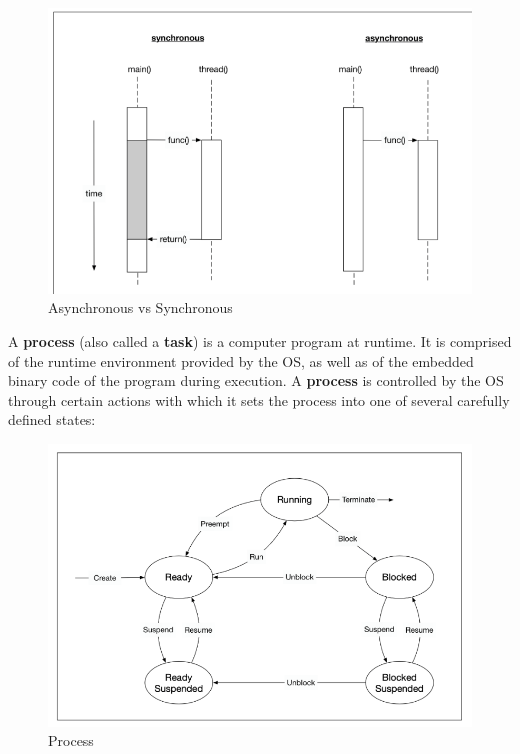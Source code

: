 \documentclass[11pt, a4paper]{article}
\begin{document}
\begin{figure}[htpb!]
	\centering
	\includegraphics[width=0.8\linewidth]{async_sync}
	\caption{Asynchronous vs Synchronous}
	\label{fig:async_sync}
\end{figure}


A \textbf{process} (also called a \textbf{task}) is a computer program at runtime. It is comprised of the runtime environment provided by the OS, as well as of the embedded binary code of the program during execution. A \textbf{process} is controlled by the OS through certain actions with which it sets the process into one of several carefully defined states:



\begin{figure}[htpb!]
	\centering
	\includegraphics[width=0.8\linewidth]{process}
	\caption{Process}
	\label{fig:process}
\end{figure}
\end{document}

